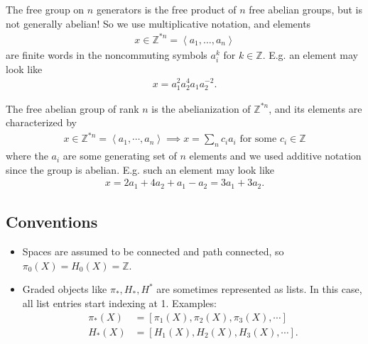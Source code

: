 \begin{remark}

The free group on \(n\) generators is the free product of \(n\) free
abelian groups, but is not generally abelian! So we use multiplicative
notation, and elements
\begin{align*}
x \in {\mathbb{Z}}^{\ast n} = \left< a_1, \ldots, a_n\right>
\end{align*}
are finite words in the noncommuting symbols \(a_i^k\) for
\(k\in {\mathbb{Z}}\). E.g. an element may look like
\begin{align*}
x = a_1^2 a_2^4 a_1 a_2^{-2}
.\end{align*}

\end{remark}

\begin{remark}

The free abelian group of rank \(n\) is the abelianization of
\({\mathbb{Z}}^{\ast n}\), and its elements are characterized by
\begin{align*}
x\in {\mathbb{Z}}^{\ast n} = \left\langle{ a_1, \cdots, a_n }\right\rangle \implies x = \sum_n c_i a_i \text{ for some } c_i \in {\mathbb{Z}}
\end{align*}
where the \(a_i\) are some generating set of \(n\) elements and we used
additive notation since the group is abelian. E.g. such an element may
look like
\begin{align*}
x = 2a_1 + 4a_2 + a_1 - a_2 = 3a_1 + 3a_2
.\end{align*}

\end{remark}

\hypertarget{conventions}{%
\subsection{Conventions}\label{conventions}}

\begin{itemize}
\item
  Spaces are assumed to be connected and path connected, so
  \(\pi_0(X) = H_0(X) = {\mathbb{Z}}\).
\item
  Graded objects like \(\pi_*, H_*, H^*\) are sometimes represented as
  lists. In this case, all list entries start indexing at 1. Examples:
  \begin{align*}
    \pi_*(X) &= [\pi_1(X), \pi_2(X), \pi_3(X), \cdots] \\
    H_*(X) &= [H_1(X), H_2(X), H_3(X), \cdots]
  .\end{align*}
\end{itemize}

